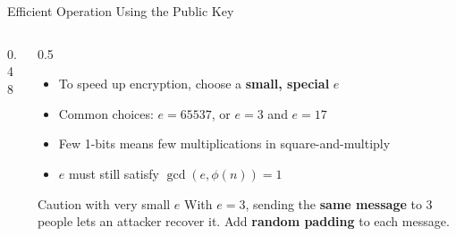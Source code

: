 \documentclass[aspectratio=169,11pt,xcolor={table}]{beamer}
\begin{document}
\begin{frame}{Efficient Operation Using the Public Key}
  \begin{columns}[c]
    \begin{column}{0.48\textwidth}
      \centering
    \end{column}
    \begin{column}{0.5\textwidth}
      \begin{itemize}\small\setlength{\itemsep}{4pt}
        \item To speed up encryption, choose a \textbf{small, special} $e$
        \item Common choices: $e = 65537$, or $e = 3$ and $e = 17$
        \item Few 1-bits means few multiplications in square-and-multiply
        \item $e$ must still satisfy $\gcd(e, \phi(n)) = 1$
      \end{itemize}
      \begin{alertblock}{Caution with very small $e$}
        \small With $e = 3$, sending the \textbf{same message} to 3 people lets an attacker recover it. Add \textbf{random padding} to each message.
      \end{alertblock}
    \end{column}
  \end{columns}
\end{frame}
\end{document}

